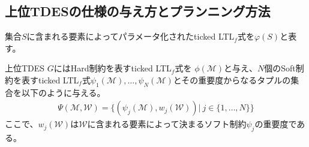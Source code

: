 \documentclass[ 10pt]{jsarticle}
\begin{document}
\subsection{上位TDESの仕様の与え方とプランニング方法}
%
%

\begin{comment}

\begin{itemize}
\item
実行列に含まれる事象$\textit{tick}$の数+1
\item
満たしたSoft制約の重要度の合計
\end{itemize}

\end{comment}

集合$S$に含まれる要素によってパラメータ化されたticked LTL${}_f$式を$\varphi(S)$と表す。

上位TDES $G$にはHard制約を表すticked LTL${}_f$式を
$\phi(\mathcal{M})$と与え、$N$個のSoft制約を表すticked LTL${}_f$式$\psi_1(\mathcal{M}),\ldots,\psi_N(\mathcal{M})$とその重要度からなるタプルの集合を以下のように与える。
\begin{align}
\Psi(\mathcal{M},\mathcal{W})
=
\{
(\psi_j(\mathcal{M}),w_j(\mathcal{W}))|~j\in\{1,\ldots,N\}
\}
\end{align}
ここで、$w_j(\mathcal{W})$は$\mathcal{W}$に含まれる要素によって決まるソフト制約$\psi_j$の重要度である。
\end{document}
